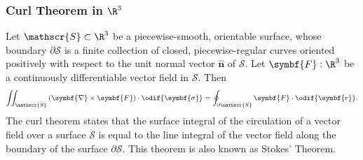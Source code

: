 \documentclass{article}
\begin{document}
\subsubsection{Curl Theorem in \texorpdfstring{\(\R^3\)}{R3}}
Let \(\mathscr{S} \subset \R^3\) be a piecewise-smooth, orientable
surface, whose boundary \(\partial \mathscr{S}\) is a finite collection of closed,
    piecewise-regular curves oriented positively with respect to the
    unit normal vector \(\hat{\symbf{n}}\) of \(\mathscr{S}\). Let
    \(\symbf{F} : \R^3\) be a continuously differentiable vector field
    in \(\mathscr{S}\). Then
\begin{equation*}
    \iint_{\mathscr{S}} \left( \symbf{\nabla} \times \symbf{F} \right) \cdot \odif{\symbf{\sigma}} = \oint_{\partial \mathscr{S}} \symbf{F} \cdot \odif{\symbf{r}}.
\end{equation*}
The curl theorem states that the surface integral of the circulation of
a vector field over a surface \(\mathscr{S}\) is equal to the line integral
of the vector field along the boundary of the surface \(\partial \mathscr{S}\). This theorem is also known as Stokes' Theorem.
\end{document}
